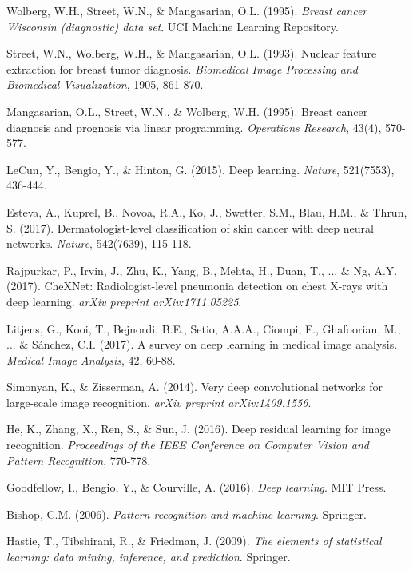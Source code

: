 \documentclass[12pt,a4paper]{article}
\begin{document}
\newpage
\begin{thebibliography}{99}

Wolberg, W.H., Street, W.N., \& Mangasarian, O.L. (1995). \textit{Breast cancer Wisconsin (diagnostic) data set}. UCI Machine Learning Repository.

Street, W.N., Wolberg, W.H., \& Mangasarian, O.L. (1993). Nuclear feature extraction for breast tumor diagnosis. \textit{Biomedical Image Processing and Biomedical Visualization}, 1905, 861-870.

Mangasarian, O.L., Street, W.N., \& Wolberg, W.H. (1995). Breast cancer diagnosis and prognosis via linear programming. \textit{Operations Research}, 43(4), 570-577.

LeCun, Y., Bengio, Y., \& Hinton, G. (2015). Deep learning. \textit{Nature}, 521(7553), 436-444.

Esteva, A., Kuprel, B., Novoa, R.A., Ko, J., Swetter, S.M., Blau, H.M., \& Thrun, S. (2017). Dermatologist-level classification of skin cancer with deep neural networks. \textit{Nature}, 542(7639), 115-118.

Rajpurkar, P., Irvin, J., Zhu, K., Yang, B., Mehta, H., Duan, T., ... \& Ng, A.Y. (2017). CheXNet: Radiologist-level pneumonia detection on chest X-rays with deep learning. \textit{arXiv preprint arXiv:1711.05225}.

Litjens, G., Kooi, T., Bejnordi, B.E., Setio, A.A.A., Ciompi, F., Ghafoorian, M., ... \& Sánchez, C.I. (2017). A survey on deep learning in medical image analysis. \textit{Medical Image Analysis}, 42, 60-88.

Simonyan, K., \& Zisserman, A. (2014). Very deep convolutional networks for large-scale image recognition. \textit{arXiv preprint arXiv:1409.1556}.

He, K., Zhang, X., Ren, S., \& Sun, J. (2016). Deep residual learning for image recognition. \textit{Proceedings of the IEEE Conference on Computer Vision and Pattern Recognition}, 770-778.

Goodfellow, I., Bengio, Y., \& Courville, A. (2016). \textit{Deep learning}. MIT Press.

Bishop, C.M. (2006). \textit{Pattern recognition and machine learning}. Springer.

Hastie, T., Tibshirani, R., \& Friedman, J. (2009). \textit{The elements of statistical learning: data mining, inference, and prediction}. Springer.


\end{thebibliography}
\end{document}
